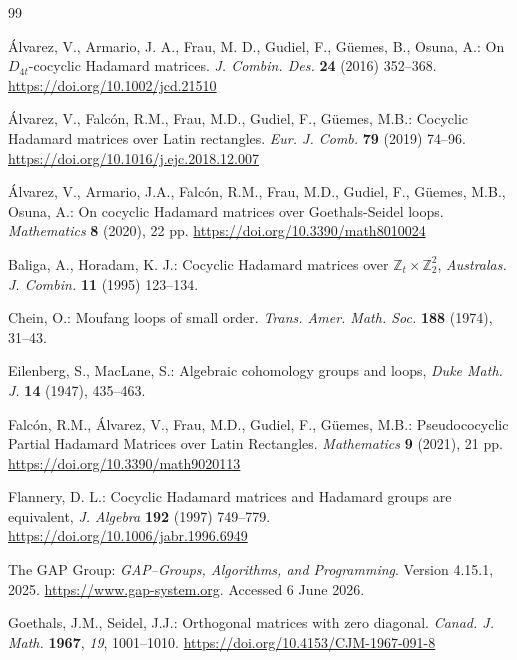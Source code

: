 \documentclass[11pt,a4paper]{article}
\begin{document}
\begin{thebibliography}{99}

 \'{A}lvarez, V., Armario, J. A., Frau, M. D., Gudiel, F., G\"uemes, B., Osuna, A.: On $D_{4t}$-cocyclic Hadamard matrices. {\em J. Combin. Des.} {\bf 24} (2016) 352--368. \url{https://doi.org/10.1002/jcd.21510}

 \'{A}lvarez, V., Falc\'{o}n, R.M., Frau, M.D., Gudiel, F., G\"uemes, M.B.: Cocyclic Hadamard matrices over Latin rectangles. {\em Eur. J. Comb.} {\bf 79} (2019) 74--96. \url{https://doi.org/10.1016/j.ejc.2018.12.007}

 \'{A}lvarez, V., Armario, J.A., Falc\'{o}n, R.M., Frau, M.D., Gudiel, F., G\"uemes, M.B., Osuna, A.: On cocyclic Hadamard matrices over Goethals-Seidel loops. {\em Mathematics} {\bf 8} (2020), 22 pp. \url{https://doi.org/10.3390/math8010024}

 Baliga, A., Horadam, K. J.: Cocyclic Hadamard matrices over $\mathbb{Z}_t\times \mathbb{Z}_2^2$, {\em Australas. J. Combin.} {\bf 11} (1995) 123--134.

 Chein, O.: Moufang loops of small order. {\em Trans. Amer. Math. Soc.} {\bf 188} (1974), 31--43.

 Eilenberg, S., MacLane, S.: Algebraic cohomology groups and loops, {\em Duke Math. J.} {\bf 14} (1947), 435--463.

 Falc\'{o}n, R.M., \'{A}lvarez, V., Frau, M.D., Gudiel, F., G\"uemes, M.B.: Pseudococyclic Partial Hadamard Matrices over Latin Rectangles. {\em Mathematics} {\bf 9} (2021), 21 pp. \url{https://doi.org/10.3390/math9020113}

 Flannery, D. L.: Cocyclic Hadamard matrices and Hadamard groups are equivalent, {\em J. Algebra} {\bf 192} (1997) 749--779. \url{https://doi.org/10.1006/jabr.1996.6949}

 The GAP Group: {\em GAP--Groups, Algorithms, and Programming}. Version 4.15.1, 2025. \url{https://www.gap-system.org}. Accessed 6 June 2026.

 Goethals, J.M., Seidel, J.J.: Orthogonal matrices with zero diagonal. {\em Canad. J. Math.} {\bf 1967}, \emph{19}, 1001--1010. \url{https://doi.org/10.4153/CJM-1967-091-8}


\end{thebibliography}
\end{document}
